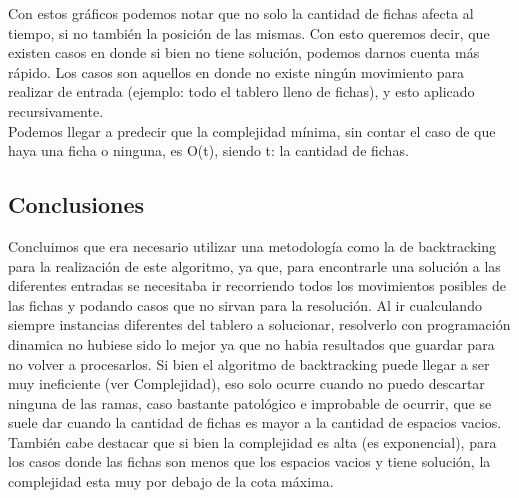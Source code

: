 Con estos gráficos podemos notar que no solo la cantidad de fichas afecta al tiempo, si no también la posición de las mismas. Con esto queremos decir, 
que existen casos en donde si bien no tiene solución, podemos darnos cuenta más rápido. Los casos son aquellos en donde no existe ningún movimiento para realizar
de entrada (ejemplo: todo el tablero lleno de fichas), y esto aplicado recursivamente.\\
Podemos llegar a predecir que la complejidad mínima, sin contar el caso de que haya una ficha o ninguna, es O(t), siendo t: la cantidad de fichas.


\subsection{Conclusiones}
Concluimos que era necesario utilizar una metodología como la de backtracking para la realización de este algoritmo, ya que, para encontrarle una solución a las diferentes entradas se necesitaba ir recorriendo todos los movimientos posibles de las fichas y podando casos que no sirvan para la resolución.
Al ir cualculando siempre instancias diferentes del tablero a solucionar, resolverlo con programación dinamica no hubiese sido lo mejor ya que no habia resultados que guardar para no volver a procesarlos.
Si bien el algoritmo de backtracking puede llegar a ser muy ineficiente (ver Complejidad), eso solo ocurre
cuando no puedo descartar ninguna de las ramas, caso bastante patológico e improbable de ocurrir, que se suele dar cuando la cantidad de fichas es mayor a la cantidad de espacios vacios.
También cabe destacar que si bien la complejidad es alta (es exponencial), para los casos donde las fichas son menos que los espacios vacios y tiene solución, la complejidad esta muy por debajo de la cota máxima.
